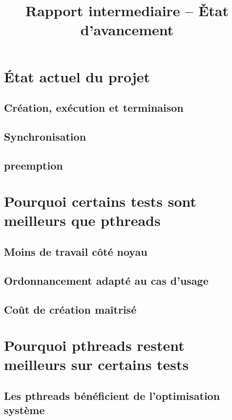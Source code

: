 \documentclass[11pt,a4paper]{article}
\title{Rapport intermediaire -- \v{E}tat d'avancement}
\author{}
\date{}
\begin{document}
\maketitle

\section{\'Etat actuel du projet}

\subsection{Cr\'eation, ex\'ecution et terminaison}


\subsection{Synchronisation}

\subsection{preemption}

\section{Pourquoi certains tests sont meilleurs que pthreads}


\subsection{Moins de travail c\^ot\'e noyau}


\subsection{Ordonnancement adapt\'e au cas d'usage}


\subsection{Co\^ut de cr\'eation ma\^itris\'e}


\section{Pourquoi pthreads restent meilleurs sur certains tests}


\subsection{Les pthreads b\'en\'eficient de l'optimisation syst\`eme}
\end{document}
